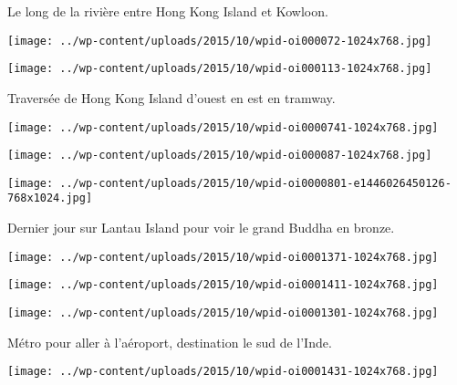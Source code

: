 \pagebreak
 Le long de la rivière entre Hong Kong Island et Kowloon. 
\begin{center} \texttt{[image: ../wp-content/uploads/2015/10/wpid-oi000072-1024x768.jpg]} \end{center}
\begin{center} \texttt{[image: ../wp-content/uploads/2015/10/wpid-oi000113-1024x768.jpg]} \end{center}
 
 \pagebreak
 Traversée de Hong Kong Island d'ouest en est en tramway. 
\begin{center} \texttt{[image: ../wp-content/uploads/2015/10/wpid-oi0000741-1024x768.jpg]} \end{center}
\begin{center} \texttt{[image: ../wp-content/uploads/2015/10/wpid-oi000087-1024x768.jpg]} \end{center}
\begin{center} \texttt{[image: ../wp-content/uploads/2015/10/wpid-oi0000801-e1446026450126-768x1024.jpg]} \end{center}

 Dernier jour sur Lantau Island pour voir le grand Buddha en bronze. 
\begin{center} \texttt{[image: ../wp-content/uploads/2015/10/wpid-oi0001371-1024x768.jpg]} \end{center}
\begin{center} \texttt{[image: ../wp-content/uploads/2015/10/wpid-oi0001411-1024x768.jpg]} \end{center}
\begin{center} \texttt{[image: ../wp-content/uploads/2015/10/wpid-oi0001301-1024x768.jpg]} \end{center}

\pagebreak
 Métro pour aller à l'aéroport, destination le sud de l'Inde. 
\begin{center} \texttt{[image: ../wp-content/uploads/2015/10/wpid-oi0001431-1024x768.jpg]} \end{center}
